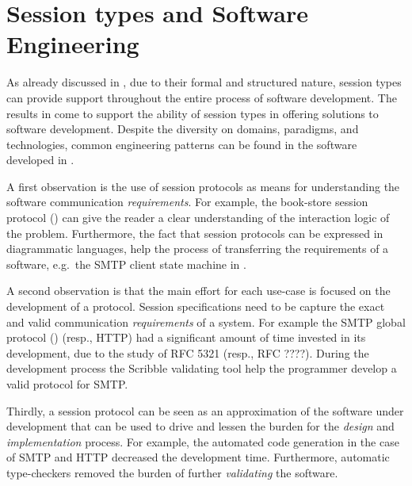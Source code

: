 \section{Session types and Software Engineering}
\label{sec:session_engineeering}




As already discussed in ,
due to their formal and structured nature,
session types can provide support throughout the
entire process of software development.
The results in  come to support
the ability of session types in offering solutions
to software development.
%
Despite the diversity on domains, paradigms,
and technologies, common engineering patterns
can be found in the software developed in .

A first observation is the use of session protocols
as means for understanding the software communication
{\em requirements}. For example, the book-store
session protocol () can give
the reader a clear understanding of the interaction logic of
the problem. Furthermore, the fact that session protocols
can be expressed in diagrammatic languages, help
the process of transferring the requirements of a software,
e.g.~the SMTP client state machine in .

A second observation is that the main effort for each use-case
is focused on the development of a protocol.
Session specifications need to be capture the exact
and valid communication {\em requirements} of a system.
For example the SMTP global protocol () (resp., HTTP)
had a significant amount of time invested in its development,
due to the study of RFC 5321 (resp., RFC ????).
During the development process the Scribble validating tool
help the programmer develop a valid protocol for SMTP.

Thirdly, a session protocol can be seen as an approximation
of the software under development that can be used to drive
and lessen the burden for the {\em design} and {\em implementation} process.
For example, the automated code generation in the case of
SMTP and HTTP decreased the development time. Furthermore,
automatic type-checkers removed the burden of further
{\em validating} the software.

